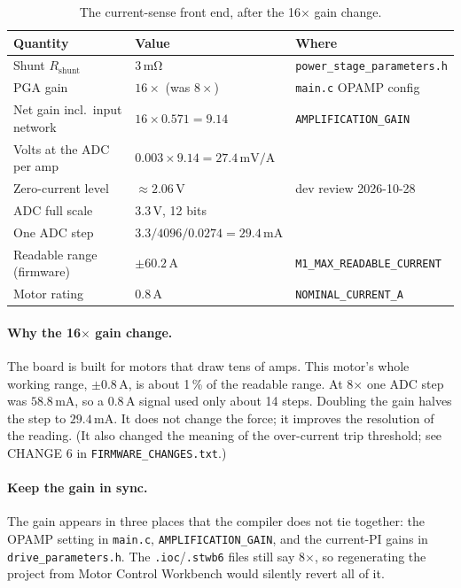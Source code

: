 \documentclass[11pt,a4paper]{article}
\newcommand{\mA}{\,\mathrm{mA}}
\newcommand{\A}{\,\mathrm{A}}
\newcommand{\file}[1]{\texttt{#1}}
\begin{document}
\begin{table}[h]
\centering
\begin{tabular}{@{}lll@{}}
\toprule
Quantity & Value & Where \\
\midrule
Shunt $R_{\mathrm{shunt}}$ & $3\,\mathrm{m\Omega}$ & \file{power\_stage\_parameters.h} \\
PGA gain & $16\times$ (was $8\times$) & \file{main.c} OPAMP config \\
Net gain incl.\ input network & $16 \times 0.571 = 9.14$ & \file{AMPLIFICATION\_GAIN} \\
Volts at the ADC per amp & $0.003 \times 9.14 = 27.4\,\mathrm{mV/A}$ & \\
Zero-current level & $\approx 2.06\,\mathrm{V}$ & dev review 2026-10-28 \\
ADC full scale & $3.3\,\mathrm{V}$, 12 bits & \\
One ADC step & $3.3/4096/0.0274 = 29.4\mA$ & \\
Readable range (firmware) & $\pm 60.2\A$ & \file{M1\_MAX\_READABLE\_CURRENT} \\
Motor rating & $0.8\A$ & \file{NOMINAL\_CURRENT\_A} \\
\bottomrule
\end{tabular}
\caption{The current-sense front end, after the 16$\times$ gain change.}
\label{tab:frontend}
\end{table}

\paragraph{Why the 16$\times$ gain change.} The board is built for motors
that draw tens of amps. This motor's whole working range, $\pm0.8\A$, is
about 1\,\% of the readable range. At 8$\times$ one ADC step was
$58.8\mA$, so a 0.8\,A signal used only about 14 steps. Doubling the gain
halves the step to $29.4\mA$. It does not change the force; it improves
the resolution of the reading. (It also changed the meaning of the
over-current trip threshold; see CHANGE 6 in
\file{FIRMWARE\_CHANGES.txt}.)

\paragraph{Keep the gain in sync.} The gain appears in three places that
the compiler does not tie together: the OPAMP setting in \file{main.c},
\file{AMPLIFICATION\_GAIN}, and the current-PI gains in
\file{drive\_parameters.h}. The \file{.ioc}/\file{.stwb6} files still say
8$\times$, so regenerating the project from Motor Control Workbench would
silently revert all of it.
\end{document}
